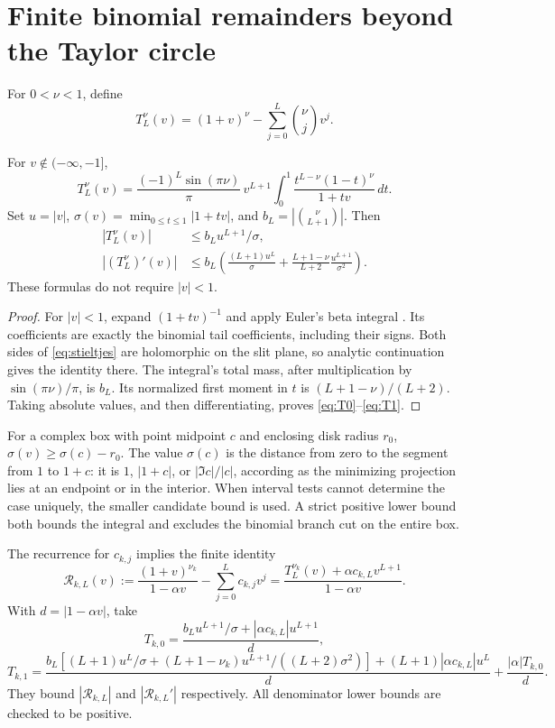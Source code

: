 \documentclass[11pt,a4paper]{article}
\begin{document}
\section{Finite binomial remainders beyond the Taylor circle}\label{sec:remainder}
For $0<\nu<1$, define
\[
 T_L^{\nu}(v)=(1+v)^\nu-\sum_{j=0}^L\binom\nu j v^j.
\]
\begin{lemma}\label{lem:stieltjes}
For $v\notin(-\infty,-1]$,
\begin{equation}\label{eq:stieltjes}
 T_L^{\nu}(v)=\frac{(-1)^L\sin(\pi\nu)}{\pi}\,v^{L+1}
             \int_0^1\frac{t^{L-\nu}(1-t)^\nu}{1+tv}\,dt.
\end{equation}
Set $u=|v|$, $\sigma(v)=\min_{0\le t\le1}|1+tv|$, and
$b_L=|\binom\nu{L+1}|$. Then
\begin{align}
 |T_L^{\nu}(v)|&\le b_Lu^{L+1}/\sigma,\label{eq:T0}\\
 |(T_L^{\nu})'(v)|&\le b_L\left(
 \frac{(L+1)u^L}{\sigma}
 +\frac{L+1-\nu}{L+2}\frac{u^{L+1}}{\sigma^2}\right).
 \label{eq:T1}
\end{align}
These formulas do not require $|v|<1$.
\end{lemma}
\begin{proof}
For $|v|<1$, expand $(1+tv)^{-1}$ and apply Euler's beta integral
\cite{DLMFBeta}. Its coefficients are exactly the binomial tail coefficients,
including their signs. Both sides of \eqref{eq:stieltjes} are holomorphic on
the slit plane, so analytic continuation gives the identity there. The
integral's total mass, after multiplication by $\sin(\pi\nu)/\pi$, is $b_L$.
Its normalized first moment in $t$ is $(L+1-\nu)/(L+2)$. Taking absolute
values, and then differentiating, proves \eqref{eq:T0}--\eqref{eq:T1}.
\end{proof}

For a complex box with point midpoint $c$ and enclosing disk radius $r_0$,
$\sigma(v)\ge\sigma(c)-r_0$. The value $\sigma(c)$ is the distance from zero
to the segment from $1$ to $1+c$: it is $1$, $|1+c|$, or
$|\Im c|/|c|$, according as the minimizing projection lies at an endpoint or
in the interior. When interval tests cannot determine the case uniquely,
the smaller candidate bound is used. A strict positive lower bound both
bounds the integral and excludes the binomial branch cut on the entire box.

The recurrence for $c_{k,j}$ implies the finite identity
\[
 \mathcal R_{k,L}(v):=\frac{(1+v)^{\nu_k}}{1-\alpha v}
                  -\sum_{j=0}^Lc_{k,j}v^j
 =\frac{T_L^{\nu_k}(v)+\alpha c_{k,L}v^{L+1}}{1-\alpha v}.
\]
With $d=|1-\alpha v|$, take
\[
 T_{k,0}=\frac{b_Lu^{L+1}/\sigma+|\alpha c_{k,L}|u^{L+1}}d,
\]
\[
 T_{k,1}=\frac{b_L[(L+1)u^L/\sigma+
             (L+1-\nu_k)u^{L+1}/((L+2)\sigma^2)]
              +(L+1)|\alpha c_{k,L}|u^L}d
               +\frac{|\alpha|T_{k,0}}d.
\]
They bound $|\mathcal R_{k,L}|$ and $|\mathcal R_{k,L}'|$ respectively.
All denominator lower bounds are checked to be positive.
\end{document}
